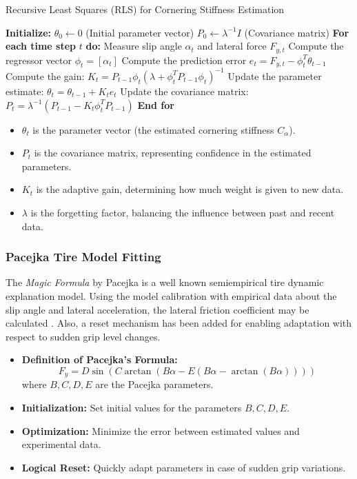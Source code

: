 \documentclass[a4paper,final,12pt]{report}
\begin{document}
\begin{algorithm}
\caption{Recursive Least Squares (RLS) for Cornering Stiffness Estimation}
\begin{algorithmic}[1]
\STATE \textbf{Initialize:}
\STATE $\theta_0 \gets 0$ \quad (Initial parameter vector)
\STATE $P_0 \gets \lambda^{-1} I$ \quad (Covariance matrix)
\STATE \textbf{For each time step} $t$ \textbf{do:}
\STATE \quad Measure slip angle $\alpha_t$ and lateral force $F_{y,t}$
\STATE \quad Compute the regressor vector $\phi_t = [\alpha_t]$
\STATE \quad Compute the prediction error $e_t = F_{y,t} - \phi_t^T \theta_{t-1}$
\STATE \quad Compute the gain: $K_t = P_{t-1} \phi_t (\lambda + \phi_t^T P_{t-1} \phi_t)^{-1}$
\STATE \quad Update the parameter estimate: $\theta_t = \theta_{t-1} + K_t e_t$
\STATE \quad Update the covariance matrix: $P_t = \lambda^{-1} (P_{t-1} - K_t \phi_t^T P_{t-1})$
\STATE \textbf{End for}
\end{algorithmic}
\end{algorithm}

\begin{itemize}
    \item $\theta_t$ is the parameter vector (the estimated cornering stiffness $C_\alpha$).
    \item $P_t$ is the covariance matrix, representing confidence in the estimated parameters.
    \item $K_t$ is the adaptive gain, determining how much weight is given to new data.
    \item $\lambda$ is the forgetting factor, balancing the influence between past and recent data.
\end{itemize}

\subsubsection{Pacejka Tire Model Fitting}
The \textit{Magic Formula} by Pacejka is a well known semiempirical tire dynamic explanation model. Using the model calibration with empirical data about the slip angle and lateral acceleration, the lateral friction coefficient may be calculated \cite{Wenzel2023}. Also, a reset mechanism has been added for enabling adaptation with respect to sudden grip level changes.

\begin{itemize}
    \item \textbf{Definition of Pacejka's Formula:}
    \begin{equation}
        F_y = D \sin \left( C \arctan \left( B \alpha - E (B \alpha - \arctan(B \alpha)) \right) \right)
    \end{equation}
    where $B, C, D, E$ are the Pacejka parameters.
    \item \textbf{Initialization:} Set initial values for the parameters $B, C, D, E$.
    \item \textbf{Optimization:} Minimize the error between estimated values and experimental data.
    \item \textbf{Logical Reset:} Quickly adapt parameters in case of sudden grip variations.
\end{itemize}
\end{document}
